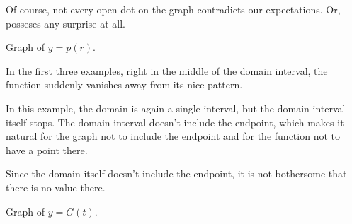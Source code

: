 \documentclass{ximera}
\begin{document}
Of course, not every open dot on the graph contradicts our expectations. Or, posseses any surprise at all.






Graph of $y = p(r)$.

\begin{image}
\end{image}








In the first three examples, right in the middle of the domain interval, the function suddenly vanishes away from its nice pattern. 

In this example, the domain is again a single interval, but the domain interval itself stops. The domain interval doesn’t include the endpoint, which makes it natural for the graph not to include the endpoint and for the function not to have a point there.

Since the domain itself doesn't include the endpoint, it is not bothersome that there is no value there.








 
Graph of $y = G(t)$.
 
\end{document}
